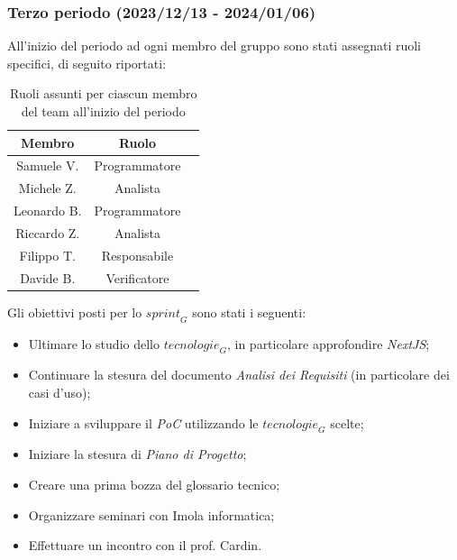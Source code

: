 \subsubsection{Terzo periodo (2023/12/13 - 2024/01/06)}
All'inizio del periodo ad ogni membro del gruppo sono stati assegnati ruoli specifici, di seguito riportati:
\begin{table}[H]
\centering
\begin{tabular}{|c|c|c|}
\hline
\textbf{Membro} & \textbf{Ruolo} \\
\hline
Samuele V. & Programmatore \\
\hline
Michele Z. & Analista \\
\hline
Leonardo B. & Programmatore \\
\hline
Riccardo Z. & Analista \\
\hline
Filippo T. & Responsabile \\
\hline
Davide B. & Verificatore \\
\hline
\end{tabular}
\caption{Ruoli assunti per ciascun membro del team all'inizio del periodo}
\end{table}


Gli obiettivi posti per lo $\textit{sprint}_G$ sono stati i seguenti:
\begin{itemize}
    \item Ultimare lo studio dello $\textit{tecnologie}_G$, in particolare approfondire \emph{NextJS};
    \item Continuare la stesura del documento \emph{Analisi dei Requisiti} (in particolare dei casi d'uso);
    \item Iniziare a sviluppare il \emph{PoC} utilizzando le $\textit{tecnologie}_G$ scelte;
    \item Iniziare la stesura di \emph{Piano di Progetto};
    \item Creare una prima bozza del glossario tecnico;
    \item Organizzare seminari con Imola informatica;
    \item Effettuare un incontro con il prof. Cardin.
\end{itemize} 


